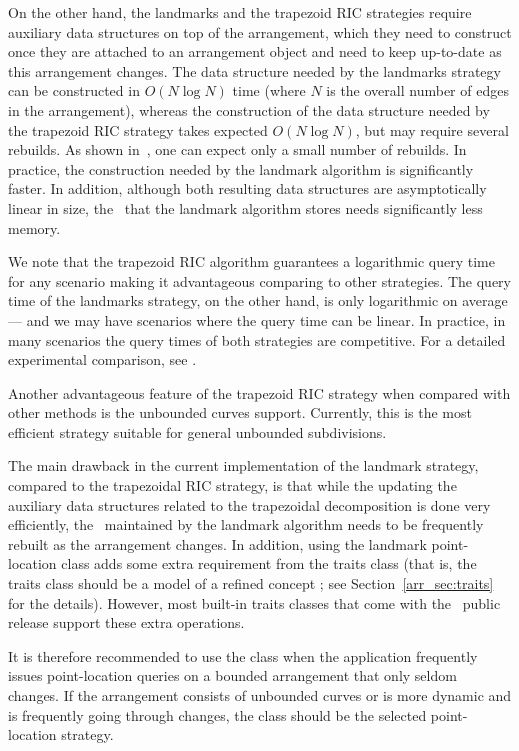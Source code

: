 On the other hand, the landmarks and the trapezoid RIC strategies
require auxiliary data structures on top of the arrangement, which
they need to construct once they are attached to an arrangement
object and need to keep up-to-date as this arrangement changes.
The data structure needed by the landmarks strategy can be constructed
in $O(N \log N)$ time (where $N$ is the overall number of edges in
the arrangement), whereas the construction of the data structure needed 
by the trapezoid RIC strategy takes expected $O(N \log N)$, but 
may require several rebuilds. As shown in~\cite{hkh-iiplgtds-12}, one can 
expect only a small number of rebuilds.
In practice, the construction needed by the landmark algorithm is
significantly faster. 
In addition, although both
resulting data structures are asymptotically linear in size, the
\kdtree\ that the landmark algorithm stores needs significantly
less memory. 

We note that the trapezoid RIC algorithm guarantees a
logarithmic query time for any scenario
making it advantageous comparing to other strategies.
The query time of the landmarks strategy, on the other hand,
 is only logarithmic on average --- and we may have
scenarios where the query time can be linear. 
In practice, in many scenarios
the query times of both strategies are competitive. For a detailed
experimental comparison, see \cite{hh-esplp-08}.

Another advantageous feature of the trapezoid RIC strategy
when compared with other methods
is the unbounded curves support. 
Currently, this is the most efficient strategy 
suitable for general unbounded subdivisions.


The main drawback in the current implementation of the landmark
strategy, compared to the trapezoidal RIC strategy, is that while
the updating the auxiliary data structures
related to the trapezoidal decomposition is done very efficiently,
the \kdtree\ maintained by the landmark algorithm needs to be
frequently rebuilt as the arrangement changes. In addition, using
the landmark point-location class adds some extra requirement
from the traits class (that is, the traits class should be a model
of a refined concept ; see
Section~\ref{arr_sec:traits} for the details). However, most
built-in traits classes that come with the \cgal\ public release
support these extra operations.

It is therefore recommended to use the
 class when the application
frequently issues point-location queries on a bounded
arrangement that only seldom changes. If the arrangement 
consists of unbounded curves or is more
dynamic and is frequently going through changes, the
 class should be the
selected point-location strategy.



